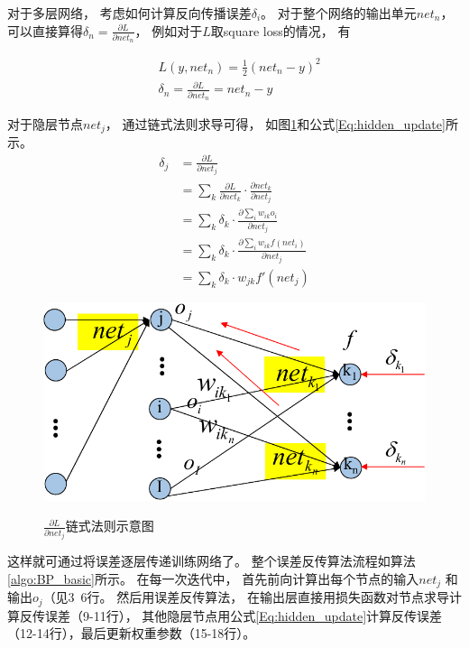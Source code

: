 对于多层网络， 考虑如何计算反向传播误差$\delta_{i}$。 对于整个网络的输出单元$net_n$， 可以直接算得$\delta_n = \frac{\partial L}{\partial net_n}$， 例如对于$L$取square loss的情况， 有


\begin{equation}
\begin{split}
&	L(y,net_n)=\frac{1}{2}(net_n-y)^2 \\
&	\delta_n = \frac{\partial L}{\partial net_n} = net_n - y
\end{split}
\end{equation}


对于隐层节点$net_j$， 通过链式法则求导可得， 如图\ref{fig:update_weight_2}和公式\ref{Eq:hidden_update}所示。 
\begin{equation}\label{Eq:hidden_update}
\begin{split}
\delta_j
	&=\frac{\partial L}{\partial net_j}\\
	&=\sum_{k}\frac{\partial L}{\partial net_k}\cdot \frac{\partial net_k}{\partial net_j}\\
	&=\sum_k \delta_{k} \cdot \frac{\partial \sum_i{w_{ik}o_i}}{\partial net_j}\\
	&=\sum_k \delta_{k} \cdot \frac{\partial \sum_i{w_{ik}f(net_i)}}{\partial net_j}\\
	&=\sum_k \delta_{k} \cdot w_{jk} f'(net_j)
\end{split}
\end{equation}

\begin{figure}[htb]
  \centering
  \includegraphics[scale=0.8]{Pictures/CNN/weight_update_2-crop.pdf}\\
  \caption{$\frac{\partial L}{\partial net_j}$链式法则示意图}\label{fig:update_weight_2}
\end{figure}

这样就可通过将误差逐层传递训练网络了。 整个误差反传算法流程如算法\ref{algo:BP_basic}所示。 在每一次迭代中， 首先前向计算出每个节点的输入$net_j$ 和输出$o_j$（见3~6行。 然后用误差反传算法， 在输出层直接用损失函数对节点求导计算反传误差（9-11行）， 其他隐层节点用公式\ref{Eq:hidden_update}计算反传误差（12-14行），最后更新权重参数（15-18行）。


